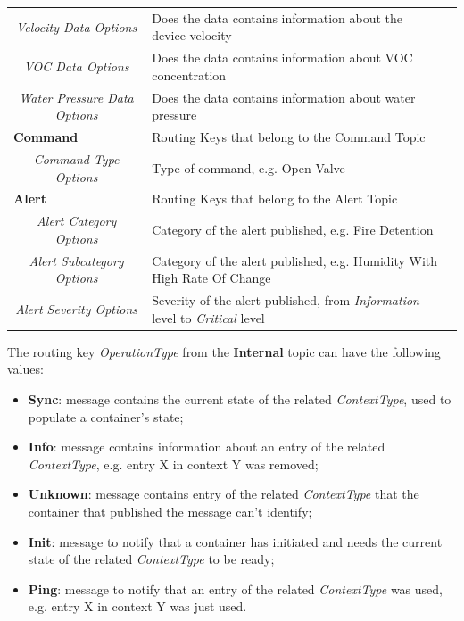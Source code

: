 \begin{landscape}
\begin{longtable}{cll}
   \textit{Velocity Data Options}          & Does the data contains information about the device velocity\footnotemark[1]\footnotemark[2]              &  \\
   \textit{VOC Data Options}               & Does the data contains information about VOC concentration\footnotemark[1]\footnotemark[2]                &  \\
   \textit{Water Pressure Data Options}    & Does the data contains information about water pressure\footnotemark[1]\footnotemark[2]                   &  \\ \cline{1-2}
   \multicolumn{1}{l}{\textbf{Command}}    & Routing Keys that belong to the Command Topic                                                             &  \\
   \textit{Command Type Options}           & Type of command, e.g. Open Valve                                                                          &  \\ \cline{1-2}
   \multicolumn{1}{l}{\textbf{Alert}}      & Routing Keys that belong to the Alert Topic                                                               &  \\
   \textit{Alert Category Options}         & Category of the alert published, e.g. Fire Detention                                                      &  \\
   \textit{Alert Subcategory Options}      & Category of the alert published, e.g. Humidity With High Rate Of Change                                   &  \\
   \textit{Alert Severity Options}         & Severity of the alert published, from \textit{Information} level to \textit{Critical} level               &  \\ \cline{1-2}
   \end{longtable}
\end{landscape}

The routing key \textit{OperationType} from the \textbf{Internal} topic can have the following values:

\begin{itemize}
   \item \textbf{Sync}: message contains the current state of the related \textit{ContextType}, used to populate a container's state;
   \item \textbf{Info}: message contains information about an entry of the related \textit{ContextType}, e.g. entry X in context Y was removed;
   \item \textbf{Unknown}: message contains entry of the related \textit{ContextType} that the container that published the message can't identify;
   \item \textbf{Init}: message to notify that a container has initiated and needs the current state of the related \textit{ContextType} to be ready;
   \item \textbf{Ping}: message to notify that an entry of the related \textit{ContextType} was used, e.g. entry X in context Y was just used.
\end{itemize}

